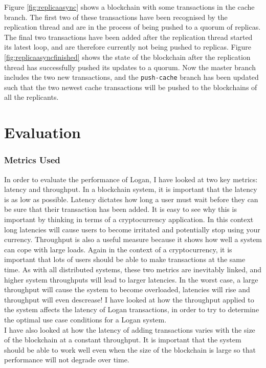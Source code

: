 \documentclass[12pt,a4paper,twoside,openright]{report}
\begin{document}
	Figure \ref{fig:replicaasync} shows a blockchain with some transactions in the cache branch.
	The first two of these transactions have been recognised by the replication thread and are in the process of being pushed to a quorum of replicas. 
	The final two transactions have been added after the replication thread started its latest loop, and are therefore currently not being pushed to replicas.
	Figure \ref{fig:replicaasyncfinished} shows the state of the blockchain after the replication thread has successfully pushed its updates to a quorum.
	Now the master branch includes the two new transactions, and the \texttt{push-cache} branch has been updated such that the two newest cache transactions will be pushed to the blockchains of all the replicants.

	\chapter{Evaluation}

	\subsection*{Metrics Used}
	In order to evaluate the performance of Logan, I have looked at two key metrics: latency and throughput.
	In a blockchain system, it is important that the latency is as low as possible. 
	Latency dictates how long a user must wait before they can be sure that their transaction has been added.
	It is easy to see why this is important by thinking in terms of a cryptocurrency application.
	In this context long latencies will cause users to become irritated and potentially stop using your currency.
	Throughput is also a useful measure because it shows how well a system can cope with large loads.
	Again in the context of a cryptocurrency, it is important that lots of users should be able to make transactions at the same time.
	As with all distributed systems, these two metrics are inevitably linked, and higher system throughputs will lead to larger latencies. 
	In the worst case, a large throughput will cause the system to become overloaded, latencies will rise and throughput will even descrease!
	I have looked at how the throughput applied to the system affects the latency of Logan transactions, in order to try to determine the optimal use case conditions for a Logan system.\\

	I have also looked at how the latency of adding transactions varies with the size of the blockchain at a constant throughput.
	It is important that the system should be able to work well even when the size of the blockchain is large so that performance will not degrade over time.
	
\end{document}
